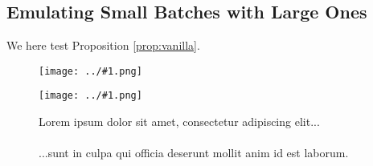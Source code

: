\documentclass{article}
\newcommand{\plotplace}[3]{
    \begin{overpic}[width=#2, height=#3]{../plots/blank.png}
        \put( 5, 85){
            \begin{tabular}{p{#2-1.0cm}}
                #1
            \end{tabular}
        }
    \end{overpic}
}
\newcommand{\plotmoo}[3]{
    \texttt{[image: ../\#1.png]}
}
\newcommand{\lorem}[1]{
    Lorem ipsum dolor sit amet, consectetur adipiscing elit...\\
    \nopagebreak\vspace{#1cm} \ \\
    ...sunt in culpa qui officia deserunt mollit anim id est laborum.
}
\begin{document}

    \subsection{Emulating Small Batches with Large Ones}
        We here test Proposition \ref{prop:vanilla}. 
        \begin{figure}[h!]
            \centering
            \plotmoo{plots/batch-match}{0.48\columnwidth}{4.0cm}
            \plotmoo{plots/big-bm}{0.48\columnwidth}{4.0cm}
            \caption{\lorem{2}}
        \end{figure}
    

    
\end{document}
